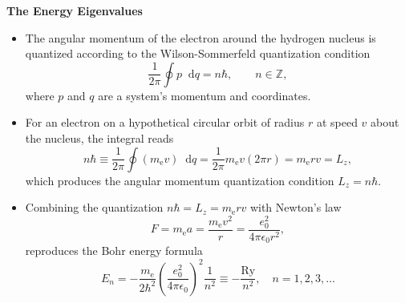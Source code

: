 \documentclass[11pt, a4paper]{article}
\newcommand{\diff}{\mathop{}\!\mathrm{d}} %
\begin{document}
\textbf{The Energy Eigenvalues}
\begin{itemize}
	\item The angular momentum of the electron around the hydrogen nucleus is quantized according to the Wilson-Sommerfeld quantization condition
	\begin{equation*}
		\frac{1}{2\pi}\oint p \diff q = n \hbar, \qquad n \in \mathbb{Z},
	\end{equation*}
	where $ p $ and $ q $ are a system's momentum and coordinates. 
	
	\item For an electron on a hypothetical circular orbit of radius $ r $ at speed $ v $ about the nucleus, the integral reads 
	\begin{equation*}
		n \hbar \equiv \frac{1}{2\pi}\oint (m_{\text{e}}v)\diff q = \frac{1}{2\pi}m_{\text{e}} v (2\pi r) = m_{\text{e}} r v = L_{z},
	\end{equation*}
	which produces the angular momentum quantization condition $ L_{z} = n \hbar $. 
	
	\item Combining the quantization $ n\hbar = L_{z} = m_{\text{e}}rv $ with Newton's law
	\begin{equation*}
		F = m_{\text{e}}a = \frac{m_{\text{e}}v^{2}}{r} = \frac{e_{0}^{2}}{4\pi \epsilon_{0}r^{2}},
	\end{equation*}
	reproduces the Bohr energy formula
	\begin{equation*}
		E_{n} = - \frac{m_{\text{e}}}{2\hbar^{2}}\left(\frac{e_{0}^{2}}{4\pi \epsilon_{0}}\right)^{2}\frac{1}{n^{2}} \equiv - \frac{\text{Ry}}{n^{2}}, \quad n = 1, 2, 3, \ldots
	\end{equation*}
	
\end{itemize}
\end{document}
